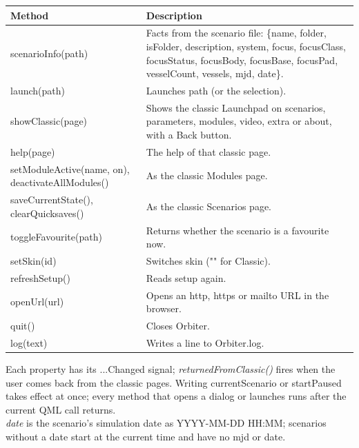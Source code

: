 \documentclass[Orbiter Developer Manual.tex]{subfiles}
\begin{document}
\begin{sloppypar}
	\begin{longtable}{ |p{}|p{}| }
	\hline\rule{0pt}{2ex}
	\textbf{Method} & \textbf{Description}\\
	\hline\rule{0pt}{2ex}
	scenarioInfo(path) & Facts from the scenario file: \{name, folder, isFolder, description, system, focus, focusClass, focusStatus, focusBody, focusBase, focusPad, vesselCount, vessels, mjd, date\}.\\
	\hline\rule{0pt}{2ex}
	launch(path) & Launches path (or the selection).\\
	\hline\rule{0pt}{2ex}
	showClassic(page) & Shows the classic Launchpad on scenarios, parameters, modules, video, extra or about, with a Back button.\\
	\hline\rule{0pt}{2ex}
	help(page) & The help of that classic page.\\
	\hline\rule{0pt}{2ex}
	setModuleActive(name, on), deactivateAllModules() & As the classic Modules page.\\
	\hline\rule{0pt}{2ex}
	saveCurrentState(), clearQuicksaves() & As the classic Scenarios page.\\
	\hline\rule{0pt}{2ex}
	toggleFavourite(path) & Returns whether the scenario is a favourite now.\\
	\hline\rule{0pt}{2ex}
	setSkin(id) & Switches skin ("" for Classic).\\
	\hline\rule{0pt}{2ex}
	refreshSetup() & Reads setup again.\\
	\hline\rule{0pt}{2ex}
	openUrl(url) & Opens an http, https or mailto URL in the browser.\\
	\hline\rule{0pt}{2ex}
	quit() & Closes Orbiter.\\
	\hline\rule{0pt}{2ex}
	log(text) & Writes a line to Orbiter.log.\\
	\hline
	\end{longtable}

\noindent
Each property has its ...Changed signal; \textit{returnedFromClassic()} fires when the user comes back from the classic pages. Writing currentScenario or startPaused takes effect at once; every method that opens a dialog or launches runs after the current QML call returns.\\
\textit{date} is the scenario's simulation date as YYYY-MM-DD HH:MM; scenarios without a date start at the current time and have no mjd or date.

\end{sloppypar}
\end{document}
